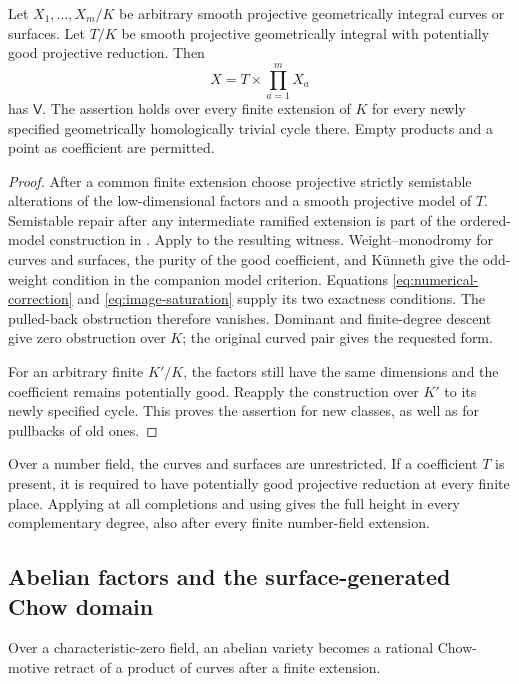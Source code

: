 \begin{theorem}\label{thm:products}
Let $X_1,\ldots,X_m/K$ be arbitrary smooth projective geometrically
integral curves or surfaces. Let $T/K$ be smooth projective
geometrically integral with potentially good projective reduction. Then
\[
 X=T\times\prod_{a=1}^mX_a
\]
has $\mathsf V$. The assertion holds over every finite extension of
$K$ for every newly specified geometrically homologically trivial
cycle there. Empty products and a point as coefficient are permitted.
\end{theorem}

\begin{proof}
After a common finite extension choose projective strictly semistable
alterations of the low-dimensional factors and a smooth projective
model of $T$. Semistable repair after any intermediate ramified
extension is part of the ordered-model construction in
\cite{InternalProducts}. Apply  to the
resulting witness. Weight--monodromy for curves and surfaces, the
purity of the good coefficient, and K\"unneth give the odd-weight
condition in the companion model criterion. Equations
\eqref{eq:numerical-correction} and \eqref{eq:image-saturation}
supply its two exactness conditions. The pulled-back obstruction
therefore vanishes. Dominant and finite-degree descent give zero
obstruction over $K$; the original curved pair gives the requested
form.

For an arbitrary finite $K'/K$, the factors still have the same
dimensions and the coefficient remains potentially good. Reapply
the construction over $K'$ to its newly specified cycle. This proves
the assertion for new classes, as well as for pullbacks of old ones.
\end{proof}

Over a number field, the curves and surfaces are unrestricted. If a
coefficient $T$ is present, it is required to have potentially good
projective reduction at every finite place. Applying
 at all completions and using
 gives the full height in every complementary
degree, also after every finite number-field extension.

\subsection{Abelian factors and the surface-generated Chow domain}

\begin{lemma}\label{lem:abelian-curve-source}
Over a characteristic-zero field, an abelian variety becomes a
rational Chow-motive retract of a product of curves after a finite
extension.
\end{lemma}

